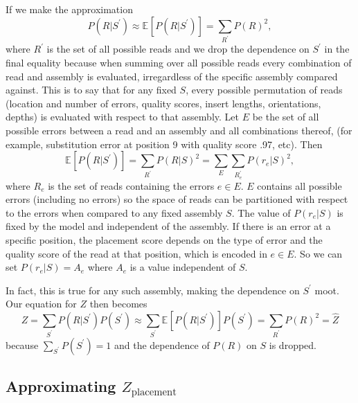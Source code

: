 \documentclass[phd,tocprelim]{cornell}
\begin{document}
If we make the approximation
\begin{equation}
    P(R|S^{\prime}) \approx \mathbb{E}_{}\left[P(R|S^{\prime})\right] = \sum_{R^{\prime}} P(R)^{2},
\end{equation}
where $R^{\prime}$ is the set of all possible reads and we drop the dependence on $S^{\prime}$ in the final equality because when summing over all possible reads every combination of read and assembly is evaluated, irregardless of the specific assembly compared against. This is to say that for any fixed $S$, every possible permutation of reads (location and number of errors, quality scores, insert lengths, orientations, depths) is evaluated with respect to that assembly. Let $E$ be the set of all possible errors between a read and an assembly and all combinations thereof, (for example, substitution error at position 9 with quality score .97, etc). Then
\begin{equation}
    \mathbb{E}_{}\left[P(R|S^{\prime})\right] = \sum_{R^{\prime}} P(R|S)^{2} = \sum_{E} \sum_{R_{e}^{\prime}} P(r_{e}|S)^{2},
\end{equation}
where $R_{e}$ is the set of reads containing the errors $e \in E$. $E$ contains all possible errors (including no errors) so the space of reads can be partitioned with respect to the errors when compared to any fixed assembly $S$. The value of $P(r_{e}|S)$ is fixed by the model and independent of the assembly. If there is an error at a specific position, the placement score depends on the type of error and the quality score of the read at that position, which is encoded in $e \in E$. So we can set $P(r_{e}|S) = A_{e}$ where $A_{e}$ is a value independent of $S$.

In fact, this is true for any such assembly, making the dependence on $S^{\prime}$ moot. Our equation for $Z$ then becomes
\begin{equation}
    Z = \sum_{S^{\prime}}P(R|S^{\prime})P(S^{\prime}) \approx \sum_{S^{\prime}} \mathbb{E}_{}\left[P(R|S^{\prime})\right] P(S^{\prime}) = \sum_{R^{\prime}} P(R)^{2} = \hat{Z}
\end{equation}
because $\sum_{S^{\prime}}P(S^{\prime}) = 1$ and the dependence of $P(R)$ on $S$ is dropped.


\subsection{Approximating $Z_{\text{placement}}$} %
\label{sub:Aprroximating Z_placement}
\end{document}
